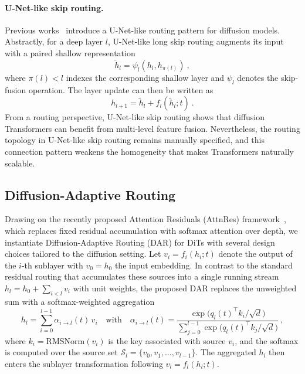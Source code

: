 \documentclass{llmxive}
\begin{document}
\paragraph{U-Net-like skip routing.}
Previous works~\citep{bao2023all,tian2024u,chen2025towards,li2024hunyuandit} introduce a U-Net-like routing pattern for diffusion models. Abstractly, for a deep layer $l$, U-Net-like long skip routing augments its input with a paired shallow representation
\begin{equation}
    \tilde{h}_l = \psi_l\left(h_{l}, h_{\pi(l)}\right) \ ,
\end{equation}
where $\pi(l) < l$ indexes the corresponding shallow layer and $\psi_l$ denotes the skip-fusion operation. The layer update can then be written as
\begin{equation}
    h_{l+1} = \tilde{h}_l + f_l(\tilde{h}_l; t) \ .
\end{equation}
From a routing perspective, U-Net-like skip routing shows that diffusion Transformers can benefit from multi-level feature fusion. Nevertheless, the routing topology in U-Net-like skip routing remains manually specified, and this connection pattern weakens the homogeneity that makes Transformers naturally scalable.

\subsection{Diffusion-Adaptive Routing}
\label{sec:DAR}

Drawing on the recently proposed Attention Residuals (AttnRes) framework~\citep{team2026attention}, which replaces fixed residual accumulation with softmax attention over depth, we instantiate Diffusion-Adaptive Routing (\textsc{DAR}) for DiTs with several design choices tailored to the diffusion setting. Let $v_i = f_i(h_i; t)$ denote the output of the $i$-th sublayer with $v_0 = h_0$ the input embedding. In contrast to the standard residual routing that accumulates these sources into a single running stream $h_l = h_0 + \sum_{i<l} v_i$ with unit weights, the proposed \textsc{DAR} replaces the unweighted sum with a softmax-weighted aggregation
\begin{equation} 
    h_l = \sum_{i=0}^{l-1} \alpha_{i \to l}(t)\, v_i 
    \quad\text{with}\quad
    \alpha_{i \to l}(t) = \frac{\exp\bigl(q_l(t)^{\top} k_i / \sqrt{d}\bigr)}{\sum_{j=0}^{l-1} \exp\bigl(q_l(t)^{\top} k_j / \sqrt{d}\bigr)} \ ,
\end{equation}
where $k_i = \mathrm{RMSNorm}(v_i)$ is the key associated with source $v_i$, and the softmax is computed over the source set $\mathcal{S}_l = \{v_0, v_1, \ldots, v_{l-1}\}$. The aggregated $h_l$ then enters the sublayer transformation following $v_l = f_l(h_l; t)$.
\end{document}

